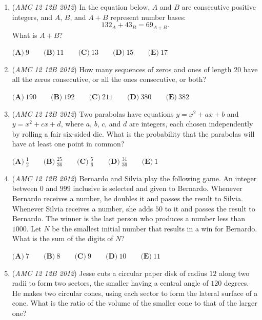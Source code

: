 \begin{enumerate}
 $\textbf{(A)}\ 24\qquad\textbf{(B)}\ 27\qquad\textbf{(C)}\ 36\qquad\textbf{(D)}\ 37.5\qquad\textbf{(E)}\ 42$


	\item (\textit{AMC 12 12B 2012}) In the equation below, $A$ and $B$ are consecutive positive integers, and $A$, $B$, and $A+B$ represent number bases: 
 \[132_A+43_B=69_{A+B}.\]
What is $A+B$?


 $\textbf{(A)}\ 9\qquad\textbf{(B)}\ 11\qquad\textbf{(C)}\ 13\qquad\textbf{(D)}\ 15\qquad\textbf{(E)}\ 17$


	\item (\textit{AMC 12 12B 2012}) How many sequences of zeros and ones of length 20 have all the zeros consecutive, or all the ones consecutive, or both?


 $\textbf{(A)}\ 190\qquad\textbf{(B)}\ 192\qquad\textbf{(C)}\ 211\qquad\textbf{(D)}\ 380\qquad\textbf{(E)}\ 382$


	\item (\textit{AMC 12 12B 2012}) Two parabolas have equations $y= x^2 + ax +b$ and $y= x^2 + cx +d$, where $a$, $b$, $c$, and $d$ are integers, each chosen independently by rolling a fair six-sided die. What is the probability that the parabolas will have at least one point in common?


 $\textbf{(A)}\ \frac{1}{2}\qquad\textbf{(B)}\ \frac{25}{36}\qquad\textbf{(C)}\ \frac{5}{6}\qquad\textbf{(D)}\ \frac{31}{36}\qquad\textbf{(E)}\ 1$


	\item (\textit{AMC 12 12B 2012}) Bernardo and Silvia play the following game. An integer between $0$ and $999$ inclusive is selected and given to Bernardo. Whenever Bernardo receives a number, he doubles it and passes the result to Silvia. Whenever Silvia receives a number, she adds $50$ to it and passes the result to Bernardo. The winner is the last person who produces a number less than $1000$. Let $N$ be the smallest initial number that results in a win for Bernardo. What is the sum of the digits of $N$?


 $\textbf{(A)}\ 7\qquad\textbf{(B)}\ 8\qquad\textbf{(C)}\ 9\qquad\textbf{(D)}\ 10\qquad\textbf{(E)}\ 11$


	\item (\textit{AMC 12 12B 2012}) Jesse cuts a circular paper disk of radius $12$ along two radii to form two sectors, the smaller having a central angle of $120$ degrees. He makes two circular cones, using each sector to form the lateral surface of a cone. What is the ratio of the volume of the smaller cone to that of the larger one?



\end{enumerate}
